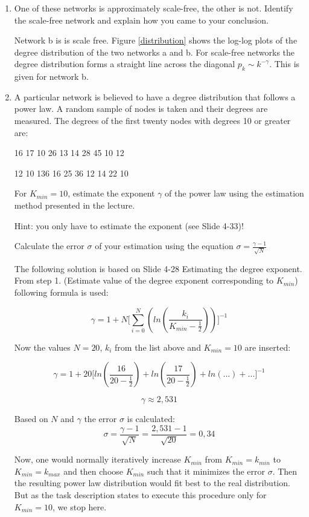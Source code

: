 \begin{enumerate}
	\item One of these networks is approximately scale-free, the other is not. Identify the scale-free network and explain how you came to your conclusion.
	
	Network b is is scale free. 
	Figure \ref{distribution} shows the log-log plots of the degree distribution of the two networks a and b. For scale-free networks the degree distribution forms a straight line across the diagonal $p_k \sim k^{-\gamma}$. This is given for network b.
	
	\item A particular network is believed to have a degree distribution that follows a power law. A random sample of nodes is taken and their degrees are measured. The degrees of the first twenty nodes with degrees 10 or greater are: 
	
	16  17  10  26  13  14  28  45  10  12
	
	12  10  136  16  25  36  12  14  22  10
	
	For $K_{min} = 10$, estimate the exponent $\gamma$ of the power law using the estimation method presented in the lecture.
	
	Hint: you only have to estimate the exponent (see Slide 4-33)!
	
	Calculate the error $\sigma$ of your estimation using the equation $\sigma = \frac{\gamma - 1}{\sqrt{N}}$
	
	\vspace{0,75cm}
	The following solution is based on Slide 4-28 Estimating the degree exponent. From step 1. (Estimate value of the degree exponent corresponding to $K_{min}$) following formula is used:
	
	\begin{equation}
	\gamma = 1 + N \biggl[ \sum_{i=0}^N (ln(\frac{k_i}{K_{min} - \frac{1}{2}})) \biggr]^{-1}
	\end{equation}
	
	Now the values $N=20$, $k_i$ from the list above and $K_{min} = 10$ are inserted:
	
	\begin{equation*}
	\gamma = 1 + 20 \biggl[ ln(\frac{16}{20-\frac{1}{2}}) + ln(\frac{17}{20-\frac{1}{2}}) + ln(...) + ... \biggr]^{-1}
	\end{equation*}
	
	\begin{equation*}
	\gamma \approx 2,531
	\end{equation*}
	
	Based on $N$ and $\gamma$ the error $\sigma$ is calculated:
	\begin{equation*}
	\sigma = \frac{\gamma - 1}{\sqrt{N}} = \frac{2,531 - 1}{\sqrt{20}} = 0,34
	\end{equation*}
	
	Now, one would normally iteratively increase $K_{min}$ from $K_{min} = k_{min}$ to $K_{min} = k_{max}$ and then choose $K_{min}$ such that it minimizes the error $\sigma$. Then the resulting power law distribution would fit best to the real distribution. But as the task description states to execute this procedure only for $K_{min} = 10$, we stop here.

\end{enumerate}